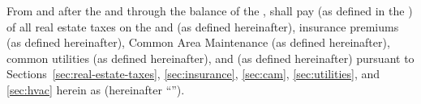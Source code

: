 From and after the \rentCommencementDate and through the balance of the \termOfLease, \lessee shall pay \lesseesPercentage (as defined in the \basicLeaseInformation) of all real estate taxes on the \building and \commonAreas (as defined hereinafter), insurance premiums (as defined hereinafter), Common Area Maintenance (as defined hereinafter), common utilities (as defined hereinafter), and  (as defined hereinafter) pursuant to Sections~\ref{sec:real-estate-taxes}, \ref{sec:insurance}, \ref{sec:cam}, \ref{sec:utilities}, and \ref{sec:hvac} herein as \additionalRent (hereinafter ``\additionalRent'').
